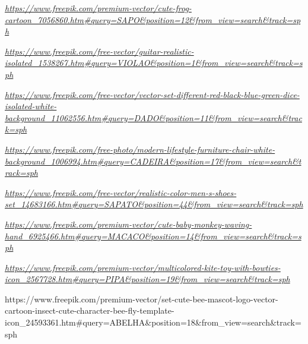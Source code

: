 \href{https://www.freepik.com/premium-vector/cute-frog-cartoon_7056860.htm\#query=SAPO\&position=12\&from_view=search\&track=sph}{\emph{https://www.freepik.com/premium-vector/cute-frog-cartoon\_7056860.htm\#query=SAPO\&position=12\&from\_view=search\&track=sph}}

\href{https://www.freepik.com/free-vector/guitar-realistic-isolated_1538267.htm\#query=VIOLAO\&position=1\&from_view=search\&track=sph}{\emph{https://www.freepik.com/free-vector/guitar-realistic-isolated\_1538267.htm\#query=VIOLAO\&position=1\&from\_view=search\&track=sph}}

\href{https://www.freepik.com/free-vector/vector-set-different-red-black-blue-green-dice-isolated-white-background_11062556.htm\#query=DADO\&position=11\&from_view=search\&track=sph}{\emph{https://www.freepik.com/free-vector/vector-set-different-red-black-blue-green-dice-isolated-white-background\_11062556.htm\#query=DADO\&position=11\&from\_view=search\&track=sph}}

\href{https://www.freepik.com/free-photo/modern-lifestyle-furniture-chair-white-background_1006994.htm\#query=CADEIRA\&position=17\&from_view=search\&track=sph}{\emph{https://www.freepik.com/free-photo/modern-lifestyle-furniture-chair-white-background\_1006994.htm\#query=CADEIRA\&position=17\&from\_view=search\&track=sph}}

\href{https://www.freepik.com/free-vector/realistic-color-men-s-shoes-set_14683166.htm\#query=SAPATO\&position=44\&from_view=search\&track=sph}{\emph{https://www.freepik.com/free-vector/realistic-color-men-s-shoes-set\_14683166.htm\#query=SAPATO\&position=44\&from\_view=search\&track=sph}}

\href{https://www.freepik.com/premium-vector/cute-baby-monkey-waving-hand_6925466.htm\#query=MACACO\&position=14\&from_view=search\&track=sph}{\emph{https://www.freepik.com/premium-vector/cute-baby-monkey-waving-hand\_6925466.htm\#query=MACACO\&position=14\&from\_view=search\&track=sph}}

\href{https://www.freepik.com/premium-vector/multicolored-kite-toy-with-bowties-icon_2567728.htm\#query=PIPA\&position=19\&from_view=search\&track=sph}{\emph{https://www.freepik.com/premium-vector/multicolored-kite-toy-with-bowties-icon\_2567728.htm\#query=PIPA\&position=19\&from\_view=search\&track=sph}}

https://www.freepik.com/premium-vector/set-cute-bee-mascot-logo-vector-cartoon-insect-cute-character-bee-fly-template-icon\_24593361.htm\#query=ABELHA\&position=18\&from\_view=search\&track=sph

